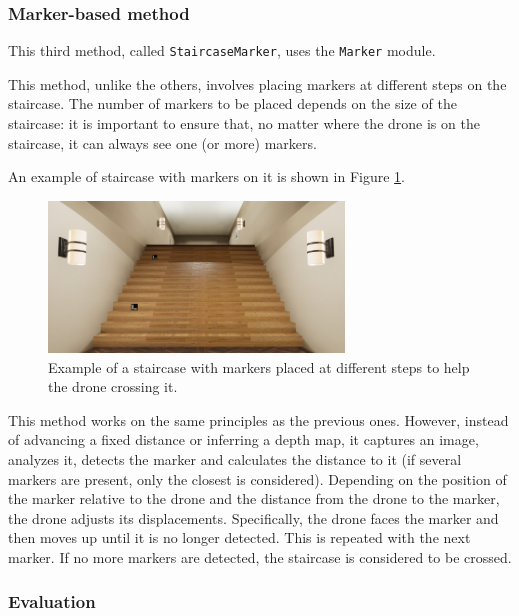 \subsubsection{Marker-based method}

This third method, called \texttt{StaircaseMarker}, uses the \texttt{Marker} module.

This method, unlike the others, involves placing markers at different steps on the staircase. The number of markers to be placed depends on the size of the staircase: it is important to ensure that, no matter where the drone is on the staircase, it can always see one (or more) markers.

An example of staircase with markers on it is shown in Figure \ref{fig:06.advanced.staircase.markers}.

\begin{figure}[H]
    \centering
    \includegraphics[width=0.7\textwidth]{resources/png/06/staircase/markers.png}
    \caption{Example of a staircase with markers placed at different steps to help the drone crossing it.}
    \label{fig:06.advanced.staircase.markers}
\end{figure}

This method works on the same principles as the previous ones. However, instead of advancing a fixed distance or inferring a depth map, it captures an image, analyzes it, detects the marker and calculates the distance to it (if several markers are present, only the closest is considered). Depending on the position of the marker relative to the drone and the distance from the drone to the marker, the drone adjusts its displacements. Specifically, the drone faces the marker and then moves up until it is no longer detected. This is repeated with the next marker. If no more markers are detected, the staircase is considered to be crossed.

\subsubsection{Evaluation}


